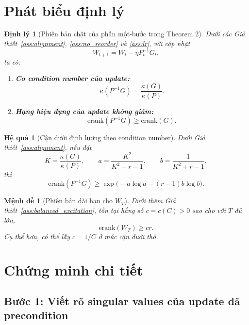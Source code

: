 \documentclass[11pt,a4paper]{article}
\newtheorem{theorem}{Định lý}
\newtheorem{corollary}{Hệ quả}
\newtheorem{proposition}{Mệnh đề}
\newcommand{\erank}{\mathrm{erank}}
\begin{document}
\section{Phát biểu định lý}

\begin{theorem}[Phiên bản chặt của phần một-bước trong Theorem 2]
\label{thm:rank_preservation_local}
Dưới các Giả thiết~\ref{ass:alignment}, \ref{ass:no_reorder} và \ref{ass:lr}, với cập nhật
\[
W_{t+1} = W_t - \eta P_t^{-1}G_t,
\]
ta có:
\begin{enumerate}[label=(\roman*)]
    \item \textbf{Co condition number của update:}
    \[
    \kappa(P^{-1}G) = \frac{\kappa(G)}{\kappa(P)}.
    \]

    \item \textbf{Hạng hiệu dụng của update không giảm:}
    \[
    \erank(P^{-1}G) \ge \erank(G).
    \]
\end{enumerate}
\end{theorem}

\begin{corollary}[Cận dưới định lượng theo condition number]
\label{cor:entropy_bound}
Dưới Giả thiết~\ref{ass:alignment}, nếu đặt
\[
K = \frac{\kappa(G)}{\kappa(P)},
\qquad
a = \frac{K^2}{K^2+r-1},
\qquad
b = \frac{1}{K^2+r-1},
\]
thì
\[
\erank(P^{-1}G) \ge \exp\!\bigl(-a\log a -(r-1)b\log b\bigr).
\]
\end{corollary}

\begin{proposition}[Phiên bản dài hạn cho $W_T$]
\label{prop:long_run}
Dưới thêm Giả thiết~\ref{ass:balanced_excitation}, tồn tại hằng số $c = c(C) > 0$ sao cho với $T$ đủ lớn,
\[
\erank(W_T) \ge c r.
\]
Cụ thể hơn, có thể lấy $c = 1/C$ ở mức cận dưới thô.
\end{proposition}

\section{Chứng minh chi tiết}

\subsection{Bước 1: Viết rõ singular values của update đã precondition}
\end{document}
